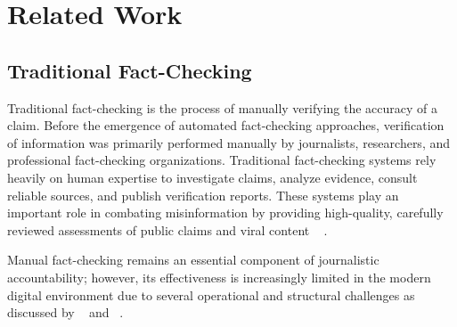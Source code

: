 \chapter{Related Work}
\label{ch:relatedWork}

\section{Traditional Fact-Checking}

Traditional fact-checking is the process of manually verifying the accuracy of a claim. Before the emergence of automated fact-checking approaches, verification of information was primarily performed manually by journalists, researchers, and professional fact-checking organizations. Traditional fact-checking systems rely heavily on human expertise to investigate claims, analyze evidence, consult reliable sources, and publish verification reports. These systems play an important role in combating misinformation by providing high-quality, carefully reviewed assessments of public claims and viral content ~\cite{QuestToAutomateFactChecking2015Oct} .

Manual fact-checking remains an essential component of journalistic accountability; however, its effectiveness is increasingly limited in the modern digital environment due to several operational and structural challenges as discussed by ~\citet{QuestToAutomateFactChecking2015Oct} and ~\citet{FactChecking2025Mar}.

